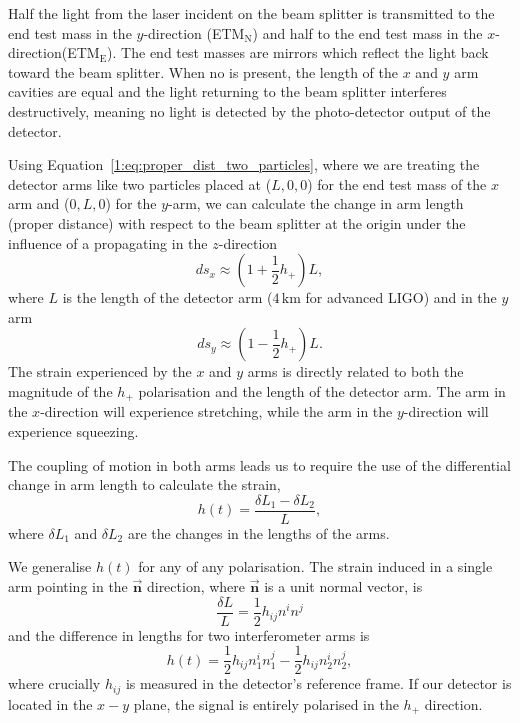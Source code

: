 Half the light from the laser incident on the beam splitter is transmitted to the end test mass in the $y$-direction (ETM$_{\text{N}}$) and half to the end test mass in the $x$-direction(ETM$_{\text{E}}$). The end test masses are mirrors which reflect the light back toward the beam splitter. When no \gw is present, the length of the $x$ and $y$ arm cavities are equal and the light returning to the beam splitter interferes destructively, meaning no light is detected by the photo-detector output of the detector.

% 
Using Equation~\ref{1:eq:proper_dist_two_particles}, where we are treating the detector arms like two particles placed at ($L, 0, 0$) for the end test mass of the $x$ arm and ($0, L, 0$) for the $y$-arm, we can calculate the change in arm length (proper distance) with respect to the beam splitter at the origin under the influence of a \gw propagating in the $z$-direction
%
\begin{equation}
    ds_{x} \approx \left(1 + \frac{1}{2}h_+\right)L,
\end{equation}
%
where $L$ is the length of the detector arm ($4 \, \text{km}$ for advanced LIGO) and in the $y$ arm
%
\begin{equation}
    ds_{y} \approx \left(1 - \frac{1}{2}h_+\right)L.
\end{equation}
%
The strain experienced by the $x$ and $y$ arms is directly related to both the magnitude of the $h_{+}$ \gwadj polarisation and the length of the detector arm. The arm in the $x$-direction will experience stretching, while the arm in the $y$-direction will experience squeezing.

The coupling of motion in both arms leads us to require the use of the differential change in arm length to calculate the \gwadj strain,
%
\begin{equation}
    h(t) = \frac{\delta L_1 - \delta L_2}{L},
    \label{1:eq:frac_length_diff_h_t}
\end{equation}
%
where $\delta L_{1}$ and $\delta L_{2}$ are the changes in the lengths of the arms.

We generalise $h(t)$ for any \gw of any polarisation. The strain induced in a single arm pointing in the $\mathbf{\vec{n}}$ direction, where $\mathbf{\vec{n}}$ is a unit normal vector, is
%
\begin{equation}
    \frac{\delta L}{L} = \frac{1}{2} h_{ij}n^{i}n^{j}
\end{equation}
%
and the difference in lengths for two interferometer arms is
%
\begin{equation}
    h(t) = \frac{1}{2} h_{ij}n_{1}^{i}n_{1}^{j} - \frac{1}{2} h_{ij}n_{2}^{i}n_{2}^{j},
\end{equation}
%
where crucially $h_{ij}$ is measured in the detector's reference frame. If our detector is located in the $x-y$ plane, the \gwadj signal is entirely polarised in the $h_{+}$ direction.

